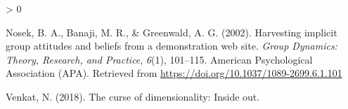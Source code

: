 \documentclass[
  10pt,
  dvipsnames,enabledeprecatedfontcommands]{scrartcl}
\newlength{\cslhangindent}
\newenvironment{CSLReferences}[2] %
 {%
  \setlength{\parindent}{0pt}
  \ifodd #1 \everypar{\setlength{\hangindent}{\cslhangindent}}\ignorespaces\fi
  \ifnum #2 > 0
  \setlength{\parskip}{#2\baselineskip}
  \fi
 }%
 {}
\begin{document}
\begin{CSLReferences}{1}{0}
\leavevmode\hypertarget{ref-Nosek2002harvesting}{}%
Nosek, B. A., Banaji, M. R., \& Greenwald, A. G. (2002). Harvesting
implicit group attitudes and beliefs from a demonstration web site.
\emph{Group Dynamics: Theory, Research, and Practice}, \emph{6}(1),
101--115. American Psychological Association ({APA}). Retrieved from
\url{https://doi.org/10.1037/1089-2699.6.1.101}

\leavevmode\hypertarget{ref-Venkat2018Curse}{}%
Venkat, N. (2018). The curse of dimensionality: Inside out.

\end{CSLReferences}
\end{document}

